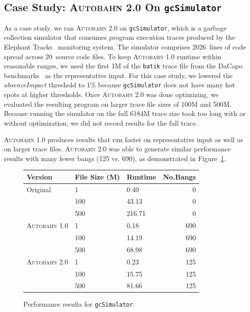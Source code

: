 \documentclass[format=sigplan, review=true, 9pt]{acmart}
\newcommand{\figref}[1]{Figure~\ref{#1}}
\newcommand{\scaption}[1]{\caption{#1}}
\newcommand{\hotspots}[0]{hot spots}
\newcommand{\Ao}[0]{\textsc{Autobahn 1.0}}
\newcommand{\At}[0]{\textsc{Autobahn 2.0}}
\newcommand{\absim}[0]{\textit{absenceImpact}}
\begin{document}
\subsection{Case Study: \At{} On \texttt{gcSimulator}}
As a case study, we ran \At{} on \texttt{gcSimulator}, which is a
garbage collection simulator that consumes program execution traces
produced by the Elephant Tracks~\cite{Ricci13} monitoring system.  The
simulator comprises 2026~lines of code spread across 20~source code
files.  To keep \Ao{} runtime within reasonable ranges, we used the
first 1M of the \texttt{batik} trace file from the DaCapo
benchmarks~\cite{Blackburn06} as the representative input.  For this
case study, we lowered the \absim{} threshold to 1\%
because \texttt{gcSimulator} does not have many \hotspots{} at higher
thresholds.  Once \At{} was done optimizing, we evaluated the
resulting program on larger trace file sizes of 100M and 500M. Because
running the simulator on the full 6184M trace size took too
long with or without optimization, we did not record results for the
full trace.

\Ao{} produces results that run
faster on representative input as well as on larger trace files.
\At{} was  able to generate similar performance results with many fewer
bangs (125 vs. 690), as demonstrated in \figref{fig:gc}.

\begin{figure}
\begin{tabular}{lllr}
\hline
Version   & File Size (M) & Runtime & No.Bangs \\
\hline
Original      & 1   &   0.40	 & 0   \\
          & 100        & 43.13      & 0 \\
       & 500     &  216.71 & 0 \\
\Ao{}       & 1     & 0.18    &  690\\
          & 100        & 14.19 &  690\\
                 & 500        & 68.98	& 690\\
\At{}      & 1   &  0.23 & 125    \\
          & 100        & 15.75 & 125      \\
       & 500    & 81.66 & 125    \\

\hline
\end{tabular}
\scaption{Performance results for \texttt{gcSimulator}.}
\label{fig:gc}
\end{figure}
\end{document}
